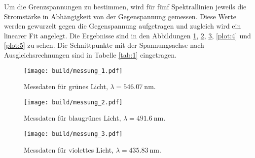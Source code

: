 
Um die Grenzspannungen zu bestimmen, wird für fünf Spektrallinien jeweils die Stromstärke in Abhängigkeit von der Gegenspannung gemessen.
Diese Werte werden gewurzelt gegen die Gegenspannung aufgetragen und zugleich wird ein linearer Fit angelegt.
Die Ergebnisse sind in den Abbildungen \ref{plot:1}, \ref{plot:2}, \ref{plot:3}, \ref{plot:4} und \ref{plot:5} zu sehen.
Die Schnittpunkte mit der Spannungsachse nach Ausgleichsrechnungen sind in Tabelle \ref{tab:1} eingetragen.

\begin{figure}
  \centering
  \texttt{[image: build/messung\_1.pdf]}
  \caption{Messdaten für grünes Licht, $\lambda = \SI{546,07}{\nano\metre}$.}
  \label{plot:1}
\end{figure}

\begin{figure}
  \centering
  \texttt{[image: build/messung\_2.pdf]}
  \caption{Messdaten für blaugrünes Licht, $\lambda = \SI{491,6}{\nano\metre}$.}
  \label{plot:2}
\end{figure}

\begin{figure}
  \centering
  \texttt{[image: build/messung\_3.pdf]}
  \caption{Messdaten für violettes Licht, $\lambda = \SI{435,83}{\nano\metre}$.}
  \label{plot:3}
\end{figure}

